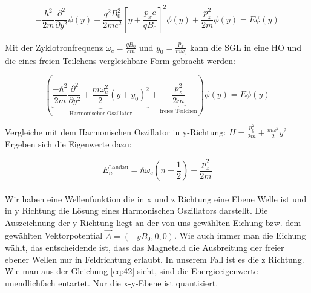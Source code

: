 \[ -\frac{ \hbar^2}{2m} \frac{\partial^2}{\partial y^2}\phi(y) + \frac{q^2 B_0^2}{2mc^2} \left[y +  \frac{p_xc}{qB_0} \right]^2\phi(y) +\frac{p_z^2}{2m}\phi(y)  = E \phi(y) \]


Mit der Zyklotronfrequenz \( \boxed{\omega_c = \frac{qB_0}{cm}} \) und \(y_0 = \frac{p_x}{m\omega_c}\) kann die SGL in eine HO und die eines freien Teilchens vergleichbare Form gebracht werden:

\[  \left( \underbrace{ \frac{- \hbar^2}{2m} \frac{\partial^2}{\partial y^2} + \frac{m\omega_c^2}{2} (y +  y_0 )^2}_{\text{Harmonischer Oszillator}} +\underbrace{ \frac{p_z^2}{2m}}_{\text{freies Teilchen}}  \right)\phi(y) = E \phi(y) \]


Vergleiche mit dem Harmonischen Oszillator in y-Richtung: \( H = \frac{p^2_y}{2m} + \frac{m\omega^2}{2}y^2 \) Ergeben sich die Eigenwerte dazu:

\begin{equation}
\label{eq:42}
 \boxed{E_n^{\text{Landau}} = \hbar\omega_c(n+\frac{1}{2}) + \frac{p_z^2}{2m} }
\end{equation}
\\
Wir haben eine Wellenfunktion die in x und z Richtung eine Ebene Welle ist und in y Richtung die Lösung eines Harmonischen Oszillators darstellt. Die Auszeichnung der y Richtung liegt an der von uns gewählten Eichung bzw. dem gewählten Vektorpotential  \(\vec A = (-yB_0,0,0)\). Wie auch immer man die Eichung wählt, das entscheidende ist, dass das Magneteld die Ausbreitung der freier ebener Wellen nur in Feldrichtung erlaubt. In unserem Fall ist es die z Richtung. Wie man aus der Gleichung \eqref{eq:42} sieht, sind die Energieeigenwerte unendlichfach entartet. Nur die x-y-Ebene ist quantisiert.





